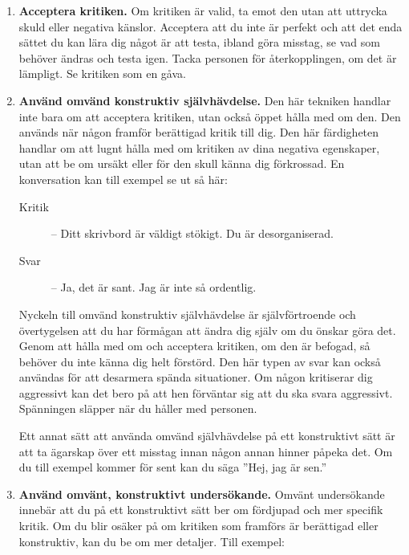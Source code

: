 \documentclass[swedish,a4paper]{book}
\begin{document}
\begin{enumerate}

\item \textbf{Acceptera kritiken.} Om kritiken är valid, ta emot den utan att uttrycka skuld eller negativa känslor. Acceptera att du inte är perfekt och att det enda sättet du kan lära dig något är att testa, ibland göra misstag, se vad som behöver ändras och testa igen. Tacka personen för återkopplingen, om det är lämpligt. Se kritiken som en gåva.

\item \textbf{Använd omvänd konstruktiv självhävdelse.} Den här tekniken handlar inte bara om att acceptera kritiken, utan också öppet hålla med om den. Den används när någon framför berättigad kritik till dig. Den här färdigheten handlar om att lugnt hålla med om kritiken av dina negativa egenskaper, utan att be om ursäkt eller för den skull känna dig förkrossad. En konversation kan till exempel se ut så här:

\begin{description}

\item[Kritik] -- Ditt skrivbord är väldigt stökigt. Du är desorganiserad.

\item[Svar] -- Ja, det är sant. Jag är inte så ordentlig.

\end{description}

Nyckeln till omvänd konstruktiv självhävdelse är självförtroende och övertygelsen att du har förmågan att ändra dig själv om du önskar göra det. Genom att hålla med om och acceptera kritiken, om den är befogad, så behöver du inte känna dig helt förstörd. Den här typen av svar kan också användas för att desarmera spända situationer. Om någon kritiserar dig aggressivt kan det bero på att hen förväntar sig att du ska svara aggressivt. Spänningen släpper när du håller med personen.

Ett annat sätt att använda omvänd självhävdelse på ett konstruktivt sätt är att ta ägarskap över ett misstag innan någon annan hinner påpeka det. Om du till exempel kommer för sent kan du säga ''Hej, jag är sen.''

\item \textbf{Använd omvänt, konstruktivt undersökande.} Omvänt undersökande innebär att du på ett konstruktivt sätt ber om fördjupad och mer specifik kritik. Om du blir osäker på om kritiken som framförs är berättigad eller konstruktiv, kan du be om mer detaljer. Till exempel:


\end{enumerate}
\end{document}
